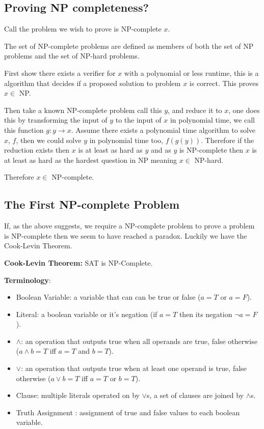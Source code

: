 \documentclass[a4paper,11pt]{report}
\newcounter{row}
\begin{document}
\subsection{Proving NP completeness?}

Call the problem we wish to prove is NP-complete $x$.

The set of NP-complete problems are defined as members of both the set of NP problems and the set of NP-hard problems. 

First show there exists a verifier for $x$ with a polynomial or less runtime, this is a algorithm that decides if a proposed solution to problem $x$ is correct. This proves $x\in$ NP.

Then take a known NP-complete problem call this $y$, and reduce it to $x$, one does this by transforming the input of $y$ to the input of $x$ in polynomial time, we call this function $g: y\rightarrow x$. Assume there exists a polynomial time algorithm to solve $x$, $f$, then we could solve $y$ in polynomial time too, $f(g(y))$. Therefore if the reduction exists then $x$ is at least as hard as $y$ and as $y$ is NP-complete then $x$ is at least as hard as the hardest question in NP meaning $x \in$ NP-hard.

Therefore $x\in $ NP-complete.

\subsection{The First NP-complete Problem} 

If, as the above suggests, we require a NP-complete problem to prove a problem is NP-complete then we seem to have reached a paradox. Luckily we have the Cook-Levin Theorem.

\textbf{Cook-Levin Theorem:} SAT is NP-Complete. \cite{compcomplexityamodernapproach}

\textbf{Terminology}:
\begin{itemize}
\item Boolean Variable: a variable that can can be true or false ($a=T$ or $a=F$).
\item Literal: a boolean variable or it's negation (if $a = T$ then its negation $\neg a = F$).
\item $\land$: an operation that outputs true when all operands are true, false otherwise ($a\land b = T$ iff $a=T$ and $b=T$).
\item $\lor$: an operation that outputs true when at least one operand is true, false otherwise ($a\lor b = T$ iff $a=T$ or $b=T$).
\item Clause: multiple literals operated on by $\lor$s, a set of clauses are joined by $\land$s.
\item Truth Assignment : assignment of true and false values to each boolean variable. 
\end{itemize}
\end{document}
